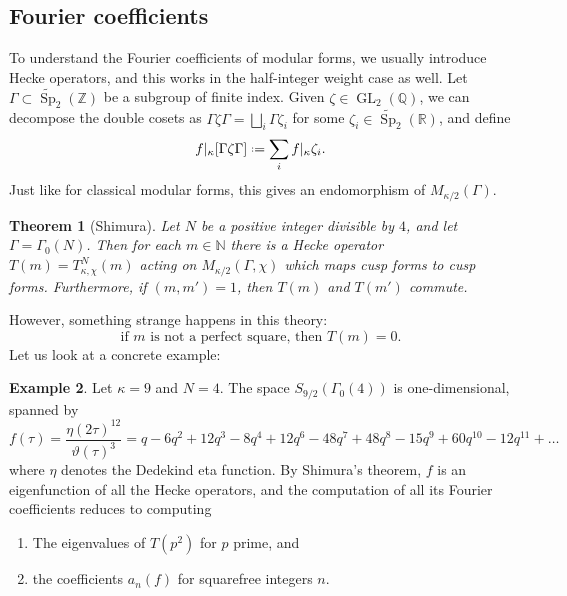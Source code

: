 \documentclass[11pt,a4paper,leqno]{article}
\newcommand{\1}{\mathbbm{1}}
\newcommand{\N}{\mathbb{N}}
\newcommand{\Z}{\mathbb{Z}}
\newcommand{\Q}{\mathbb{Q}}
\newcommand{\R}{\mathbb{R}}
\newcommand*{\defeq}{\mathrel{\vcenter{\baselineskip0.5ex \lineskiplimit0pt
      \hbox{\scriptsize.}\hbox{\scriptsize.}}}%
  =}
\renewcommand{\theta}{\vartheta}
\DeclareMathOperator{\Sp}{Sp}
\newcommand{\SpC}{\widetilde{\operatorname{\Sp}}}
\DeclareMathOperator{\GL}{GL}
\theoremstyle{plain}
\newtheorem{theorem}{Theorem}[section]
\theoremstyle{definition}
\newtheorem{example}[theorem]{Example}
\theoremstyle{remark}
\numberwithin{equation}{section}
\begin{document}
\subsection{Fourier coefficients}
\label{sec:four-coeffs}
To understand the Fourier coefficients of modular forms, we usually
introduce Hecke operators, and this works in the half-integer weight
case as well. Let $\Gamma \subset \SpC_{2}(\Z)$ be a subgroup of finite index. Given
$\zeta \in \GL_{2}(\Q)$, we can decompose the double cosets as $\Gamma \zeta \Gamma =
\bigsqcup_{i}\Gamma \zeta_{i}$ for some $\zeta_{i} \in \SpC_{2}(\R)$, and define
\begin{equation}
  \label{eq:4} 
f |_{\kappa}[\Gamma \zeta \Gamma] \defeq \sum_{i} f|_{\kappa}\zeta_{i}.
\end{equation}
Just like for classical modular forms, this gives an endomorphism of $M_{\kappa/2}(\Gamma)$.
\begin{theorem}[Shimura]
Let $N$ be a positive integer divisible by $4$, and let $\Gamma =
\Gamma_{0}(N)$. Then for each $m \in \N$ there is a Hecke operator $T(m) =
T_{\kappa,\chi}^{N}(m)$ acting on $M_{\kappa/2}(\Gamma,\chi)$ which maps cusp forms to cusp
forms. Furthermore, if $(m,m') = 1$, then $T(m)$ and $T(m')$ commute.
\end{theorem}
However, something strange happens in this theory:
\[ \text{if $m$ is not a perfect square, then } T(m) = 0. 
\]
Let us look at a concrete example:
\begin{example}\label{eg:9/2-mf}
  Let $\kappa = 9$ and $N=4$. The space $S_{9/2}(\Gamma_{0}(4))$ is
  one-dimensional, spanned by 
  \begin{equation}
    \label{eq:4}
f(\tau) = \frac{\eta(2\tau)^{12}}{\theta(\tau)^{3}} = q - 6q^2 + 12q^3 - 8q^4 + 12q^6 - 48q^7 + 48q^8 - 15q^9 + 60q^{10} - 12q^{11} + \ldots
  \end{equation}
  where $\eta$ denotes the Dedekind eta function. By Shimura's theorem,
  $f$ is an eigenfunction of all the Hecke operators, and the
  computation of all its Fourier coefficients reduces to computing
  \begin{enumerate}
  \item The eigenvalues of $T(p^{2})$ for $p$ prime, and 
  \item the coefficients $a_{n}(f)$ for squarefree integers $n$.
  \end{enumerate}
\end{example}
\end{document}
